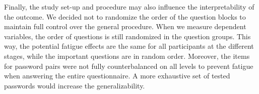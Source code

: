 Finally, the study set-up and procedure may also influence the interpretability of the outcome. We decided not to randomize the order of the question blocks to maintain full control over the general procedure. When we measure dependent variables, the order of questions is still randomized in the question groups. This way, the potential fatigue effects are the same for all participants at the different stages, while the important questions are in random order. Moreover, the items for password pairs were not fully counterbalanced on all levels to prevent fatigue when answering the entire questionnaire. A more exhaustive set of tested passwords would increase the generalizability. 




